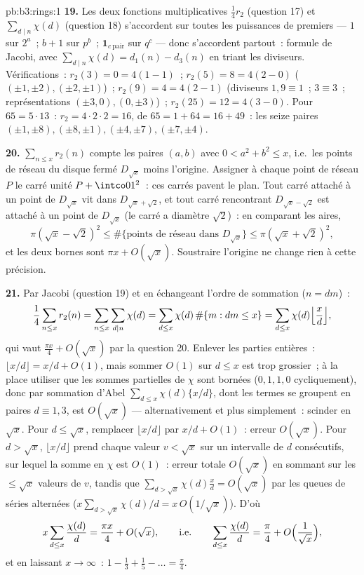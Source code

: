 \begin{solution}{pb:b3:rings:1}
\textbf{19.} Les deux fonctions multiplicatives $\frac14r_2$
(question 17) et $\sum_{d\mid n}\chi(d)$ (question 18)
s'accordent sur toutes les puissances de premiers --- $1$ sur
$2^a$~; $b + 1$ sur $p^b$~; $\mathbf 1_{c\ \mathrm{pair}}$ sur
$q^c$ --- donc s'accordent partout~: formule de Jacobi, avec
$\sum_{d\mid n}\chi(d) = d_1(n) - d_3(n)$ en triant les
diviseurs. Vérifications~: $r_2(3) = 0 = 4(1 - 1)$~; $r_2(5) =
8 = 4(2 - 0)$ ($(\pm1,\pm2), (\pm2,\pm1)$)~; $r_2(9) = 4 =
4(2 - 1)$ (diviseurs $1, 9 \equiv 1$~; $3 \equiv 3$~;
représentations $(\pm3, 0), (0, \pm3)$)~; $r_2(25) = 12 =
4(3 - 0)$. Pour $65 = 5\cdot13$~: $r_2 = 4\cdot2\cdot2 = 16$,
de $65 = 1 + 64 = 16 + 49$~: les seize paires $(\pm1, \pm8),
(\pm8, \pm1), (\pm4, \pm7), (\pm7, \pm4)$.

\textbf{20.} $\sum_{n \leq x}r_2(n)$ compte les paires $(a, b)$
avec $0 < a^2 + b^2 \leq x$, i.e.\ les points de réseau du
disque fermé $D_{\sqrt x}$ moins l'origine. Assigner à chaque
point de réseau $P$ le carré unité $P + \intco01^2$~: ces
carrés pavent le plan. Tout carré attaché à un point de
$D_{\sqrt x}$ vit dans $D_{\sqrt x + \sqrt2}$, et tout carré
rencontrant $D_{\sqrt x - \sqrt 2}$ est attaché à un point de
$D_{\sqrt x}$ (le carré a diamètre $\sqrt 2$)~: en comparant
les aires,
\[
\pi(\sqrt x - \sqrt2)^2 \leq \#\{\text{points de réseau dans }
D_{\sqrt x}\} \leq \pi(\sqrt x + \sqrt 2)^2,
\]
et les deux bornes sont $\pi x + O(\sqrt x)$. Soustraire
l'origine ne change rien à cette précision.

\textbf{21.} Par Jacobi (question 19) et en échangeant l'ordre
de sommation ($n = dm$)~:
\[
\frac14\sum_{n\leq x}r_2(n) = \sum_{n \leq x}\sum_{d \mid
n}\chi(d) = \sum_{d \leq x}\chi(d)\,\#\{m : dm \leq x\}
= \sum_{d\leq x}\chi(d)\Bigl\lfloor\frac xd\Bigr\rfloor,
\]
qui vaut $\frac{\pi x}4 + O(\sqrt x)$ par la question 20.
Enlever les parties entières~: $\lfloor x/d\rfloor = x/d +
O(1)$, mais sommer $O(1)$ sur $d \leq x$ est trop grossier~; à
la place utiliser que les sommes partielles de $\chi$ sont
bornées ($0, 1, 1, 0$ cycliquement), donc par sommation d'Abel
$\sum_{d\leq x}\chi(d)\{x/d\}$, dont les termes se groupent en
paires $d \equiv 1, 3$, est $O(\sqrt x)$ ---
alternativement et plus simplement~: scinder en $\sqrt x$. Pour
$d \leq \sqrt x$, remplacer $\lfloor x/d\rfloor$ par $x/d +
O(1)$~: erreur $O(\sqrt x)$. Pour $d > \sqrt x$, $\lfloor
x/d\rfloor$ prend chaque valeur $v < \sqrt x$ sur un intervalle
de $d$ consécutifs, sur lequel la somme en $\chi$ est $O(1)$~:
erreur totale $O(\sqrt x)$ en sommant sur les $\leq \sqrt x$
valeurs de $v$, tandis que $\sum_{d > \sqrt x}\chi(d)\frac xd =
O(\sqrt x)$ par les queues de séries alternées
($x\sum_{d>\sqrt x}\chi(d)/d = x\,O(1/\sqrt x)$). D'où
\[
x\sum_{d \leq x}\frac{\chi(d)}d = \frac{\pi x}4 + O(\sqrt x),
\qquad\text{i.e.}\qquad
\sum_{d\leq x}\frac{\chi(d)}d = \frac\pi4 +
O\Bigl(\frac1{\sqrt x}\Bigr),
\]
et en laissant $x \to \infty$~: $1 - \frac13 + \frac15 - \dots
= \frac\pi4$.


\end{solution}
